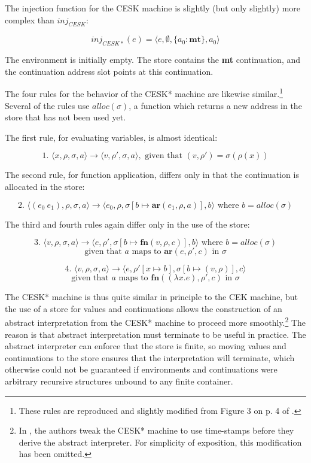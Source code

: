 \documentclass{article}
\begin{document}
The injection function for the CESK machine is slightly (but only slightly) more complex than $inj_{CESK}$:

$$ inj_{CESK*}(e) = \langle e, \emptyset, \{ a_0: \textbf{mt} \}, a_0 \rangle $$

The environment is initially empty. The store contains the \textbf{mt} continuation, and the continuation address slot points at this continuation.

The four rules for the behavior of the CESK* machine are likewise similar.\footnote{These rules are reproduced and slightly modified from Figure 3 on p. 4 of \cite{aam}.} Several of the rules use $alloc(\sigma)$, a function which returns a new address in the store that has not been used yet.

The first rule, for evaluating variables, is almost identical:

$$
\text{1. }
\langle x, \rho, \sigma, a \rangle
\to
\langle v, \rho', \sigma, a \rangle,
\text{ given that } (v, \rho') = \sigma(\rho(x))
$$

The second rule, for function application, differs only in that the continuation is allocated in the store:

$$
\text{2. }
\langle (e_0\ e_1), \rho, \sigma, a \rangle
\to
\langle e_0, \rho, \sigma[b \mapsto \textbf{ar}(e_1, \rho, a)], b \rangle
\text{ where $b = alloc(\sigma)$}
$$

The third and fourth rules again differ only in the use of the store:

$$
\text{3. }
\langle v, \rho, \sigma, a \rangle
\to
\langle e, \rho', \sigma[b \mapsto \textbf{fn}(v, \rho, c)], b \rangle
\text{ where $b = alloc(\sigma)$}
$$
$$
\text{given that $a$ maps to $\textbf{ar}(e, \rho', c)$ in $\sigma$}
$$

$$
\text{4. }
\langle v, \rho, \sigma, a \rangle
\to
\langle e, \rho'[x \mapsto b], \sigma[b \mapsto (v, \rho)], c \rangle
$$
$$
\text{given that $a$ maps to $\textbf{fn}((\lambda x.e), \rho', c)$ in $\sigma$}
$$

The CESK* machine is thus quite similar in principle to the CEK machine, but the use of a store for values and continuations allows the construction of an abstract interpretation from the CESK* machine to proceed more smoothly.\footnote{In \cite{aam}, the authors tweak the CESK* machine to use time-stamps before they derive the abstract interpreter. For simplicity of exposition, this modification has been omitted.} The reason is that abstract interpretation must terminate to be useful in practice. The abstract interpreter can enforce that the store is finite, so moving values and continuations to the store ensures that the interpretation will terminate, which otherwise could not be guaranteed if environments and continuations were arbitrary recursive structures unbound to any finite container.
\end{document}
